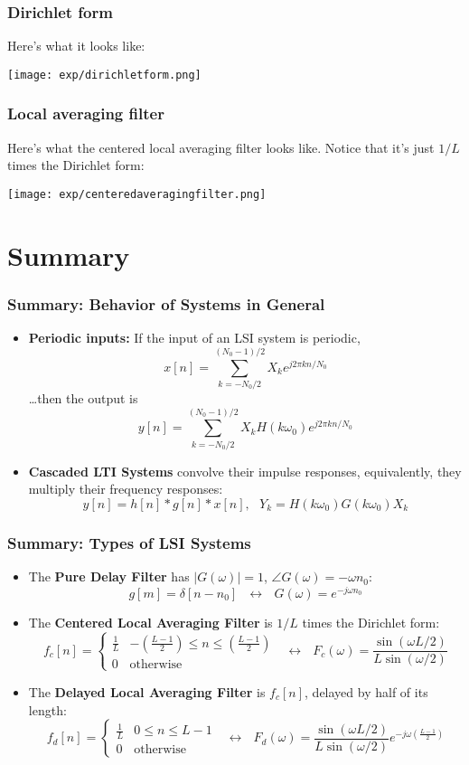\documentclass{beamer}
\begin{document}
\begin{frame}
  \frametitle{Dirichlet form}

  Here's what it looks like:
  \centerline{\texttt{[image: exp/dirichletform.png]}}
\end{frame}
  
\begin{frame}
  \frametitle{Local averaging filter}

  Here's what the centered local averaging filter looks like.  Notice that
  it's just $1/L$ times the Dirichlet form:
  \centerline{\texttt{[image: exp/centeredaveragingfilter.png]}}
\end{frame}
  

\section[Summary]{Summary}
\setcounter{subsection}{1}

\begin{frame}
  \frametitle{Summary: Behavior of Systems in General}
  \begin{itemize}
  \item {\bf Periodic inputs:}
    If the input of an LSI system is periodic,
    \[
    x[n] =\sum_{k=-N_0/2}^{(N_0-1)/2} X_k e^{j2\pi kn/N_0}
    \]
    \ldots then the output is
    \[
    y[n] = \sum_{k=-N_0/2}^{(N_0-1)/2} X_k H(k\omega_0) e^{j2\pi kn/N_0}
    \]
  \item {\bf Cascaded LTI Systems} convolve their impulse responses, equivalently, they
    multiply their frequency responses:
    \[
    y[n]=h[n]\ast g[n]\ast x[n],~~~Y_k=H(k\omega_0)G(k\omega_0)X_k
    \]
  \end{itemize}
\end{frame}

\begin{frame}
  \frametitle{Summary: Types of LSI Systems}
  \begin{itemize}
  \item The {\bf Pure Delay Filter} has $|G(\omega)|=1$, $\angle G(\omega)=-\omega n_0$:
    \[
    g[m]=\delta[n-n_0]~~~\leftrightarrow~~~G(\omega) = e^{-j\omega n_0}
    \]
  \item The {\bf Centered Local Averaging Filter} is $1/L$ times
    the Dirichlet form:
    \[
    f_c[n] = \begin{cases}
      \frac{1}{L} & -\left(\frac{L-1}{2}\right)\le n\le \left(\frac{L-1}{2}\right)\\
      0 & \mbox{otherwise}
    \end{cases}~~~\leftrightarrow~~~
    F_c(\omega)=\frac{\sin(\omega L/2)}{L\sin(\omega/2)}
    \]
  \item The {\bf Delayed Local Averaging Filter} is $f_c[n]$, delayed by half of its length:
    \[
    f_d[n] = \begin{cases}
      \frac{1}{L} & 0\le n\le L-1\\
      0 & \mbox{otherwise}
    \end{cases}~~~\leftrightarrow~~~
    F_d(\omega)=\frac{\sin(\omega L/2)}{L\sin(\omega/2)}e^{-j\omega\left(\frac{L-1}{2}\right)}
    \]
  \end{itemize}
\end{frame}
\end{document}
